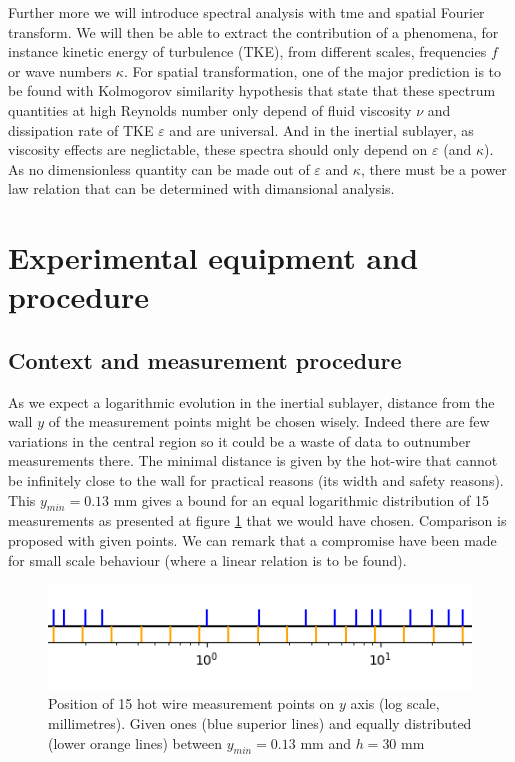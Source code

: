 \documentclass[12pt]{article}
\begin{document}
Further more we will introduce spectral analysis with tme and spatial Fourier transform. We will then be able to extract the contribution of a phenomena, for instance kinetic energy of turbulence (TKE), from different scales, frequencies $f$ or wave numbers $\kappa$. For spatial transformation, one of the major prediction is to be found with Kolmogorov similarity hypothesis that state that these spectrum quantities at high Reynolds number only depend of fluid viscosity $\nu$ and dissipation rate of TKE $\varepsilon$ and are universal. And in the inertial sublayer, as viscosity effects are neglictable, these spectra should only depend on $\varepsilon$ (and $\kappa$). As no dimensionless quantity can be made out of $\varepsilon$ and $\kappa$, there must be a power law relation that can be determined with dimansional analysis.



\section{Experimental equipment and procedure}


\subsection{Context and measurement procedure}



As we expect a logarithmic evolution in the inertial sublayer, distance from the wall $y$ of the measurement points might be chosen wisely. Indeed there are few variations in the central region so it could be a waste of data to outnumber measurements there. The minimal distance is given by the hot-wire that cannot be infinitely close to the wall for practical reasons (its width and safety reasons). This $y_{min} = 0.13$ \si{mm} gives a bound for an equal logarithmic distribution of 15 measurements as presented at figure \ref{fig:mes_points} that we would have chosen. Comparison is proposed with given points. We can remark that a compromise have been made for small scale behaviour (where a linear relation is to be found).\\

\begin{figure}[h!]
    \centering
    \includegraphics[width=0.4\linewidth]{Python/Lab_mes_points_zoom.png}
    \caption{Position of 15 hot wire measurement points on $y$ axis (log scale, millimetres). Given ones (blue superior lines) and equally distributed (lower orange lines) between $y_{min} = 0.13$ \si{mm} and $h = 30$ \si{mm}}
    \label{fig:mes_points}
\end{figure}
\end{document}
